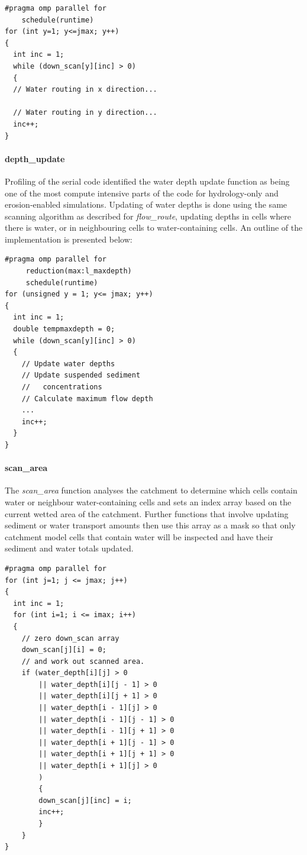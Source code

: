 \begin{verbatim}
#pragma omp parallel for
    schedule(runtime)
for (int y=1; y<=jmax; y++)
{
  int inc = 1;
  while (down_scan[y][inc] > 0)
  {
  // Water routing in x direction...
  
  // Water routing in y direction...
  inc++;
}
\end{verbatim}

\paragraph*{depth\_update}
Profiling of the serial code identified the water depth update function as being one of the most compute intensive parts of the code for hydrology-only and erosion-enabled simulations. Updating of water depths is done using the same scanning algorithm as described for \textit{flow\_route}, updating depths in cells where there is water, or in neighbouring cells to water-containing cells. An outline of the implementation is presented below:

\begin{verbatim}
#pragma omp parallel for 
     reduction(max:l_maxdepth)
     schedule(runtime)
for (unsigned y = 1; y<= jmax; y++)
{
  int inc = 1;
  double tempmaxdepth = 0;
  while (down_scan[y][inc] > 0)
  {
    // Update water depths
    // Update suspended sediment 
    //   concentrations
    // Calculate maximum flow depth
    ...
    inc++;
  }
}
\end{verbatim}

\paragraph*{scan\_area}
The \textit{scan\_area} function analyses the catchment to determine which cells contain water or neighbour water-containing cells and sets an index array based on the current wetted area of the catchment. Further functions that involve updating sediment or water transport amounts then use this array as a mask so that only catchment model cells that contain water will be inspected and have their sediment and water totals updated.
\begin{verbatim}
#pragma omp parallel for
for (int j=1; j <= jmax; j++)
{
  int inc = 1;
  for (int i=1; i <= imax; i++)
  {
    // zero down_scan array
    down_scan[j][i] = 0;
    // and work out scanned area. 
    if (water_depth[i][j] > 0
        || water_depth[i][j - 1] > 0
        || water_depth[i][j + 1] > 0
        || water_depth[i - 1][j] > 0
        || water_depth[i - 1][j - 1] > 0
        || water_depth[i - 1][j + 1] > 0
        || water_depth[i + 1][j - 1] > 0
        || water_depth[i + 1][j + 1] > 0
        || water_depth[i + 1][j] > 0
        )
        {
        down_scan[j][inc] = i;
        inc++;
        }
    }
}
\end{verbatim}

